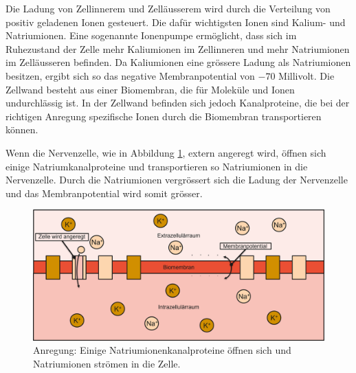 \begin{refsection}
Die Ladung von Zellinnerem und Zelläusserem wird durch die Verteilung von positiv geladenen Ionen gesteuert.
Die dafür wichtigsten Ionen sind Kalium- und Natriumionen. 
Eine sogenannte Ionenpumpe ermöglicht, dass sich im Ruhezustand der Zelle mehr Kaliumionen im Zellinneren und mehr
Natriumionen im Zelläusseren befinden.
Da Kaliumionen eine grössere Ladung als Natriumionen besitzen, ergibt sich so das negative Membranpotential von $-70$
Millivolt.
Die Zellwand besteht aus einer Biomembran, die für Moleküle und Ionen undurchlässig ist.
In der Zellwand befinden sich jedoch Kanalproteine, die bei der richtigen Anregung spezifische Ionen durch die
Biomembran transportieren können.

Wenn die Nervenzelle, wie in Abbildung \ref{fig:Anregung}, extern angeregt wird, öffnen sich einige Natriumkanalproteine und transportieren so Natriumionen in
die Nervenzelle.
Durch die Natriumionen vergrössert sich die Ladung der Nervenzelle und das Membranpotential wird somit grösser.
\begin{figure}[h]
    \centering
    \includegraphics[width=\textwidth]{papers/nerven/Bilder/Vorgang2.png}
    \caption{Anregung: Einige Natriumionenkanalproteine öffnen sich und Natriumionen strömen in die Zelle.}
    \label{fig:Anregung}
\end{figure}


\end{refsection}
